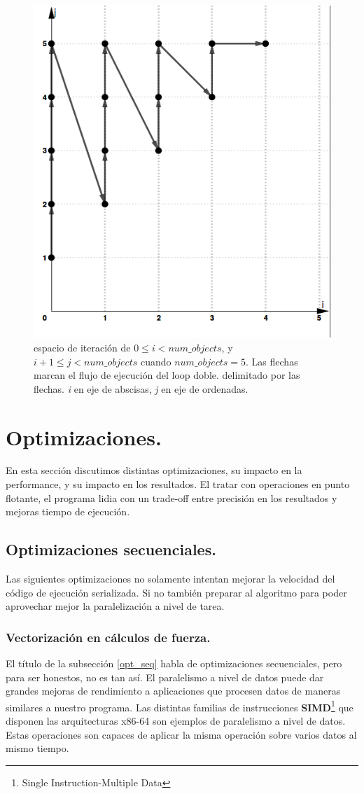 \documentclass{article}
\begin{document}
\begin{figure}[h!]
	\centering
	\includegraphics[width=0.6\linewidth,height=0.6\textwidth]{resources/loop_anidado_no_tiling_505x565.png}
	\caption{espacio de iteración de $0\leq{i} < {num\_objects}$, y $i+1\leq{j} < {num\_objects}$
	cuando ${num\_objects}=5$. Las flechas marcan el flujo de ejecución del loop doble.
	delimitado por las flechas. \textit{i} en eje de abscisas, \textit{j} en eje de ordenadas.}
	\label{fig:no_tiling}
\end{figure}

\section{Optimizaciones.\label{opt}}

En esta sección discutimos distintas optimizaciones, su impacto en la performance,
y su impacto en los resultados. El tratar con operaciones en punto flotante, el programa
lidia con un trade-off entre precisión en los resultados y mejoras tiempo de ejecución.

\subsection{Optimizaciones secuenciales.\label{opt_seq}}
Las siguientes optimizaciones no solamente intentan mejorar la velocidad
del código de ejecución serializada. Si no también preparar al algoritmo
para poder aprovechar mejor la paralelización a nivel de tarea.

\subsubsection{Vectorización en cálculos de fuerza.\label{simd}}
El título de la subsección \ref{opt_seq} habla de optimizaciones secuenciales, pero para ser honestos,
no es tan así. El paralelismo a nivel de datos puede dar grandes mejoras de rendimiento a aplicaciones
que procesen datos de maneras similares a nuestro programa. Las distintas familias de instrucciones
\textbf{SIMD}\footnote{Single Instruction-Multiple Data} que disponen las arquitecturas x86-64 son
ejemplos de paralelismo a nivel de datos. Estas operaciones son capaces de aplicar la misma operación sobre varios
datos al mismo tiempo.
\end{document}
